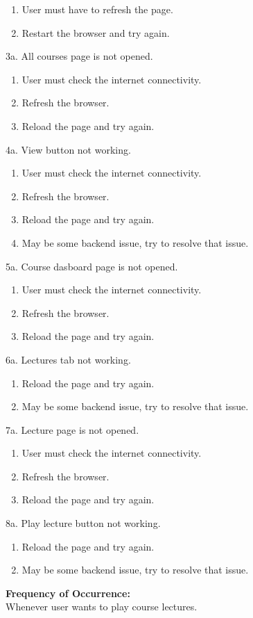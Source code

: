 \documentclass[12pt]{article}
\begin{document}
\begin{enumerate}
\item User must have to refresh the page.
\item Restart the browser and try again.
\end{enumerate} 
3a. All courses page is not opened.
\begin{enumerate}
\item User must check the internet connectivity.
\item Refresh the browser.
\item Reload the page and try again.
\end{enumerate}
4a. View button not working.
\begin{enumerate}
\item User must check the internet connectivity.
\item Refresh the browser.
\item Reload the page and try again.
\item May be some backend issue, try to resolve that issue.
\end{enumerate}
5a. Course dasboard page is not opened.
\begin{enumerate}
\item User must check the internet connectivity.
\item Refresh the browser.
\item Reload the page and try again.
\end{enumerate}
6a. Lectures tab not working.
\begin{enumerate}
\item Reload the page and try again.
\item May be some backend issue, try to resolve that issue.
\end{enumerate}
7a. Lecture page is not opened.
\begin{enumerate}
\item User must check the internet connectivity.
\item Refresh the browser.
\item Reload the page and try again.
\end{enumerate}
8a. Play lecture button not working.
\begin{enumerate}
\item Reload the page and try again.
\item May be some backend issue, try to resolve that issue.
\end{enumerate}
\textbf{Frequency of Occurrence:}\\
Whenever user wants to play course lectures.
\end{document}
